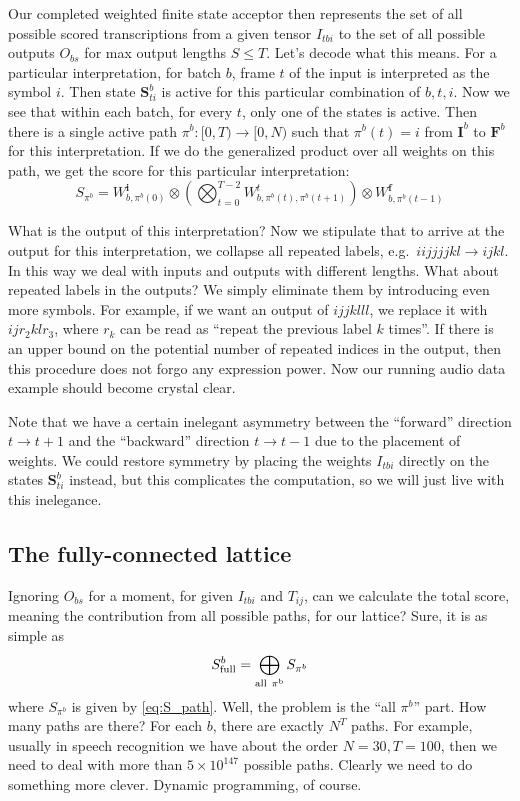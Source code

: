 \documentclass[a4paper]{article}
\begin{document}
Our completed weighted finite state acceptor then represents the set of all possible scored transcriptions from a given tensor $I_{tbi}$ to the set of all possible outputs $O_{bs}$ for max output lengths $S \leq T$. Let's decode what this means. For a particular interpretation, for batch $b$, frame $t$ of the input is interpreted as the symbol $i$. Then state $\mathbf{S}^b_{ti}$ is active for this particular combination of $b, t, i$. Now we see that within each batch, for every $t$, only one of the states is active. Then there is a single active path $\pi^b:[0, T)\rightarrow [0, N)$ such that $\pi^b(t)=i$ from $\mathbf{I}^b$ to $\mathbf{F}^b$ for this interpretation. If we do the generalized product over all weights on this path, we get the score for this particular interpretation:
\begin{equation}
\label{eq:S_path}
S_{\pi^b}= W^{\mathbf{i}}_{b,\pi^b(0)} \otimes \left(\bigotimes_{t=0}^{T-2}W^{t}_{b,\pi^b(t),\pi^b(t+1)}\right)\otimes W^{\mathbf{f}}_{b,\pi^b(t-1)}
\end{equation}

What is the output of this interpretation? Now we stipulate that to arrive at the output for this interpretation, we collapse all repeated labels, e.g.~$iijjjjkl\rightarrow ijkl$. In this way we deal with inputs and outputs with different lengths. What about repeated labels in the outputs? We simply eliminate them by introducing even more symbols. For example, if we want an output of $ijjklll$, we replace it with $ijr_2klr_3$, where $r_k$ can be read as ``repeat the previous label $k$ times''. If there is an upper bound on the potential number of repeated indices in the output, then this procedure does not forgo any expression power. Now our running audio data example should become crystal clear.

Note that we have a certain inelegant asymmetry between the ``forward'' direction $t\rightarrow t+1$ and the ``backward'' direction $t\rightarrow t-1$ due to the placement of weights. We could restore symmetry by placing the weights $I_{tbi}$ directly on the states $\mathbf{S}^b_{ti}$ instead, but this complicates the computation, so we will just live with this inelegance.

\subsection{The fully-connected lattice}

Ignoring $O_{bs}$ for a moment, for given $I_{tbi}$ and $T_{ij}$, can we calculate the total score, meaning the contribution from all possible paths, for our lattice? Sure, it is as simple as
\begin{equation}
S^b_{\rm{full}} = \bigoplus_{\rm{all~}\pi^b} S_{\pi^b}
\end{equation}
where $S_{\pi^b}$ is given by \eqref{eq:S_path}. Well, the problem is the ``all $\pi^b$'' part. How many paths are there? For each $b$, there are exactly $N^T$ paths. For example, usually in speech recognition we have about the order $N=30, T=100$, then we need to deal with more than $5\times 10^{147}$ possible paths. Clearly we need to do something more clever. Dynamic programming, of course.
\end{document}
